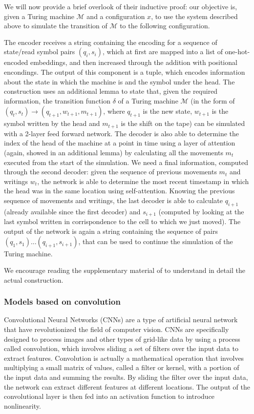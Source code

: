 \documentclass{article}
\begin{document}
We will now provide a brief overlook of their inductive proof: our objective is, given a Turing machine $\mathcal{M}$ and a configuration $x$, to use the system described above to simulate the transition of $\mathcal{M}$ to the following configuration.

The encoder receives a string containing the encoding for a sequence of state/read symbol pairs $(q_i,s_i)$, which at first are mapped into a list of one-hot-encoded embeddings, and then increased through the addition with positional encondings. The output of this component is a tuple, which encodes information about the state in which the machine is and the symbol under the head. The construction uses an additional lemma to state that, given the required information, the transition function $\delta$ of a Turing machine $\mathcal{M}$ (in the form of $(q_t,s_t) \to (q_{t+1}, w_{t+1}, m_{t+1})$, where $q_{t+1}$ is the new state, $w_{t+1}$ is the symbol written by the head and $m_{t+1}$ is the shift on the tape) can be simulated with a 2-layer feed forward network. The decoder is also able to determine the index of the head of the machine at a point in time using a layer of attention (again, showed in an additional lemma) by calculating all the movements $m_t$ executed from the start of the simulation. We need a final information, computed through the second decoder: given the sequence of previous movements $m_t$ and writings $w_t$, the network is able to determine the most recent timestamp in which the head was in the same location using self-attention. Knowing the previous sequence of movements and writings, the last decoder is able to calculate $q_{i+1}$ (already available since the first decoder) and $s_{i+1}$ (computed by looking at the last symbol written in corrispondence to the cell to which we just moved). The output of the network is again a string containing the sequence of pairs $(q_1,s_1)...(q_{i+1},s_{i+1})$, that can be used to continue the simulation of the Turing machine.

We encourage reading the supplementary material of \cite{PER19} to understand in detail the actual construction.

\subsubsection{Models based on convolution}
Convolutional Neural Networks (CNNs) are a type of artificial neural network that have revolutionized the field of computer vision. CNNs are specifically designed to process images and other types of grid-like data by using a process called convolution, which involves sliding a set of filters over the input data to extract features. Convolution is actually a mathematical operation that involves multiplying a small matrix of values, called a filter or kernel, with a portion of the input data and summing the results. By sliding the filter over the input data, the network can extract different features at different locations. The output of the convolutional layer is then fed into an activation function to introduce nonlinearity.
\end{document}
